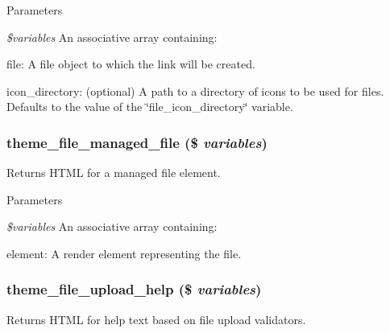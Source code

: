 \begin{DoxyParams}{Parameters}
\item[{\em \$variables}]An associative array containing:
\begin{DoxyItemize}
\item file: A file object to which the link will be created.
\item icon\_\-directory: (optional) A path to a directory of icons to be used for files. Defaults to the value of the \char`\"{}file\_\-icon\_\-directory\char`\"{} variable. 
\end{DoxyItemize}\end{DoxyParams}
\hypertarget{group__themeable_ga4a224a07d1150f036feea621eb99fbe5}{
\subsubsection[{theme\_\-file\_\-managed\_\-file}]{\setlength{\rightskip}{0pt plus 5cm}theme\_\-file\_\-managed\_\-file (\$ {\em variables})}}
\label{group__themeable_ga4a224a07d1150f036feea621eb99fbe5}
Returns HTML for a managed file element.


\begin{DoxyParams}{Parameters}
\item[{\em \$variables}]An associative array containing:
\begin{DoxyItemize}
\item element: A render element representing the file. 
\end{DoxyItemize}\end{DoxyParams}
\hypertarget{group__themeable_gaddc2762286376b44aa1a4ca0ce9e1a6e}{
\subsubsection[{theme\_\-file\_\-upload\_\-help}]{\setlength{\rightskip}{0pt plus 5cm}theme\_\-file\_\-upload\_\-help (\$ {\em variables})}}
\label{group__themeable_gaddc2762286376b44aa1a4ca0ce9e1a6e}
Returns HTML for help text based on file upload validators.


